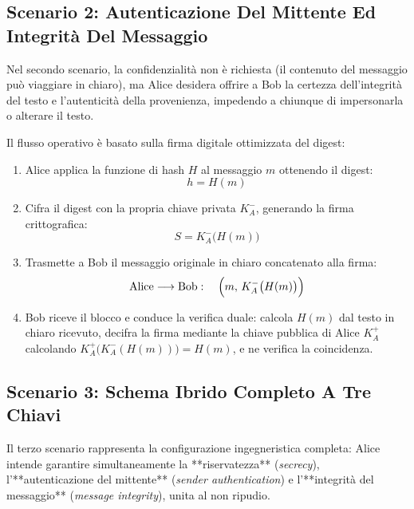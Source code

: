 \documentclass[11pt, a4paper]{article}
\begin{document}
\subsection{Scenario 2: Autenticazione Del Mittente Ed Integrità Del Messaggio}

Nel secondo scenario, la confidenzialità non è richiesta (il contenuto del messaggio può viaggiare in chiaro), ma Alice desidera offrire a Bob la certezza dell'integrità del testo e l'autenticità della provenienza, impedendo a chiunque di impersonarla o alterare il testo.


Il flusso operativo è basato sulla firma digitale ottimizzata del digest:
\begin{enumerate}[leftmargin=*]
    \item Alice applica la funzione di hash $H$ al messaggio $m$ ottenendo il digest:
    \[
    h = H(m)
    \]
    \item Cifra il digest con la propria chiave privata $K_A^-$, generando la firma crittografica:
    \[
    S = K_A^-\bigl(H(m)\bigr)
    \]
    \item Trasmette a Bob il messaggio originale in chiaro concatenato alla firma:
    \[
    \text{Alice} \longrightarrow \text{Bob}: \quad \Bigl(m, \, K_A^-\bigl(H(m)\bigr)\Bigr)
    \]
    \item Bob riceve il blocco e conduce la verifica duale: calcola $H(m)$ dal testo in chiaro ricevuto, decifra la firma mediante la chiave pubblica di Alice $K_A^+$ calcolando $K_A^+\bigl(K_A^-(H(m))\bigr) = H(m)$, e ne verifica la coincidenza.
\end{enumerate}

\subsection{Scenario 3: Schema Ibrido Completo A Tre Chiavi}

Il terzo scenario rappresenta la configurazione ingegneristica completa: Alice intende garantire simultaneamente la **riservatezza** (\emph{secrecy}), l'**autenticazione del mittente** (\emph{sender authentication}) e l'**integrità del messaggio** (\emph{message integrity}), unita al non ripudio.
\end{document}
